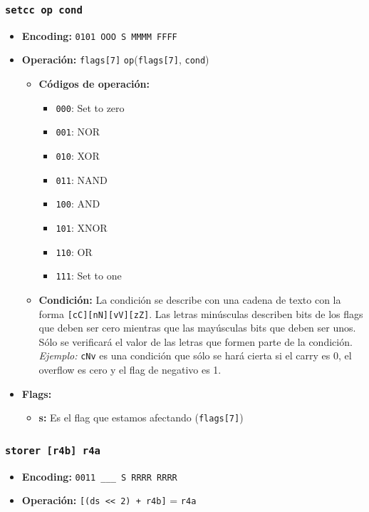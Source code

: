 \documentclass{article}
\begin{document}
\subsubsection{\texttt{setcc op cond}}
\begin{itemize}
    \item \textbf{Encoding:} \texttt{0101 OOO S MMMM FFFF}
    \item \textbf{Operación:} \texttt{flags[7]} \Leftarrow \texttt{op}(\texttt{flags[7]}, \texttt{cond})
        \begin{itemize}
            \item \textbf{Códigos de operación:}
                \begin{itemize}
                    \item \texttt{000}: Set to zero
                    \item \texttt{001}: NOR
                    \item \texttt{010}: XOR
                    \item \texttt{011}: NAND
                    \item \texttt{100}: AND
                    \item \texttt{101}: XNOR
                    \item \texttt{110}: OR
                    \item \texttt{111}: Set to one
                \end{itemize}
            \item \textbf{Condición:} La condición se describe con una cadena de texto con la forma \texttt{[cC][nN][vV][zZ]}. Las letras minúsculas describen bits de los flags que deben ser cero mientras que las mayúsculas bits que deben ser unos. Sólo se verificará el valor de las letras que formen parte de la condición. \emph{Ejemplo:} \texttt{cNv} es una condición que sólo se hará cierta si el carry es 0, el overflow es cero y el flag de
            negativo es 1.
        \end{itemize}
        \item \textbf{Flags:}
        \begin{itemize}
            \item \textbf{s:} Es el flag que estamos afectando (\texttt{flags[7]})
        \end{itemize}
  \end{itemize}
      
\subsubsection{\texttt{storer [r4b] r4a}}
\begin{itemize}
    \item \textbf{Encoding:} \texttt{0011 \_\_\_ S RRRR RRRR}
    \item \textbf{Operación:} \texttt{[(ds << 2) + r4b]} = \texttt{r4a}
\end{itemize}
\end{document}
